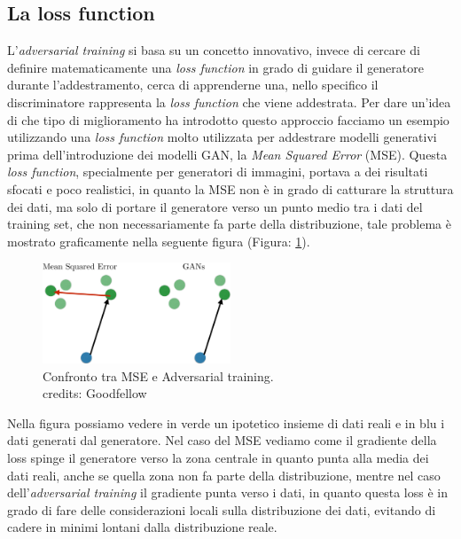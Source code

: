 \subsection{La loss function}
L'\textit{adversarial training} si basa su un concetto innovativo, invece di cercare di definire matematicamente una \textit{loss function} in grado
di guidare il generatore durante l'addestramento, cerca di apprenderne una, nello specifico il discriminatore rappresenta la \textit{loss function} che viene addestrata.
Per dare un'idea di che tipo di miglioramento ha introdotto questo approccio facciamo un esempio utilizzando una \textit{loss function} molto utilizzata 
per addestrare modelli generativi prima dell'introduzione dei modelli GAN, la \textit{Mean Squared Error} (MSE).
Questa \textit{loss function}, specialmente per generatori di immagini, portava a dei risultati sfocati e poco realistici, in quanto la MSE non è in grado di catturare
la struttura dei dati, ma solo di portare il generatore verso un punto medio tra i dati del training set, che non necessariamente fa parte della distribuzione,
tale problema è mostrato graficamente nella seguente figura (Figura: \ref{fig:mse_vs_adversarial}).\\

    \begin{figure}[H]
        \centering
        \includegraphics[width=0.5\textwidth]{imgs/mse_vs_adversarial.png}
        \caption{Confronto tra MSE e Adversarial training.\\
        credits: Goodfellow \cite{goodfellow2016ganintro}}
        \label{fig:mse_vs_adversarial}
    \end{figure}

Nella figura possiamo vedere in verde un ipotetico insieme di dati reali e in blu i dati generati dal generatore.
Nel caso del MSE vediamo come il gradiente della loss spinge il generatore verso la zona centrale in quanto punta alla media dei dati reali, 
anche se quella zona non fa parte della distribuzione, mentre nel caso dell'\textit{adversarial training} il gradiente punta verso i dati,
in quanto questa loss è in grado di fare delle considerazioni locali sulla distribuzione dei dati, evitando di cadere in minimi lontani dalla distribuzione reale.\\

